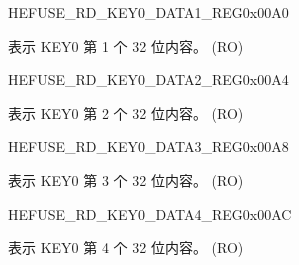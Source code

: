 \begin{register}{H}{EFUSE\_RD\_KEY0\_DATA1\_REG}{0x00A0}\label{regdesc:EFUSERDKEY0DATA1REG}
%
\regnewline%
\begin{regdesc}\begin{reglist}
\label{fielddesc:EFUSEKEY0DATA1}\item [EFUSE\_KEY0\_DATA1] 表示 KEY0 第 1 个 32 位内容。 (RO)
\end{reglist}\end{regdesc}
\end{register}


\begin{register}{H}{EFUSE\_RD\_KEY0\_DATA2\_REG}{0x00A4}\label{regdesc:EFUSERDKEY0DATA2REG}
%
\regnewline%
\begin{regdesc}\begin{reglist}
\label{fielddesc:EFUSEKEY0DATA2}\item [EFUSE\_KEY0\_DATA2] 表示 KEY0 第 2 个 32 位内容。 (RO)
\end{reglist}\end{regdesc}
\end{register}


\begin{register}{H}{EFUSE\_RD\_KEY0\_DATA3\_REG}{0x00A8}\label{regdesc:EFUSERDKEY0DATA3REG}
%
\regnewline%
\begin{regdesc}\begin{reglist}
\label{fielddesc:EFUSEKEY0DATA3}\item [EFUSE\_KEY0\_DATA3] 表示 KEY0 第 3 个 32 位内容。 (RO)
\end{reglist}\end{regdesc}
\end{register}


\begin{register}{H}{EFUSE\_RD\_KEY0\_DATA4\_REG}{0x00AC}\label{regdesc:EFUSERDKEY0DATA4REG}
%
\regnewline%
\begin{regdesc}\begin{reglist}
\label{fielddesc:EFUSEKEY0DATA4}\item [EFUSE\_KEY0\_DATA4] 表示 KEY0 第 4 个 32 位内容。 (RO)
\end{reglist}\end{regdesc}
\end{register}


